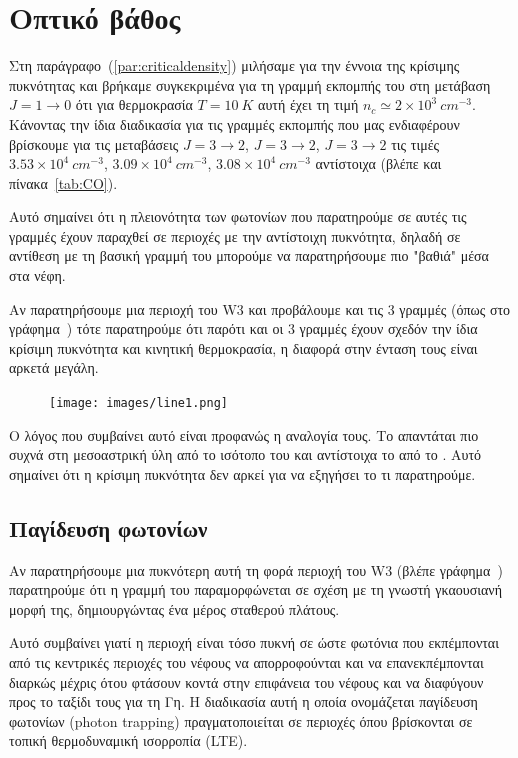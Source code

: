 \documentclass[a4paper,12pt]{memoir}
\newcommand{\e}[1]{\times 10^{#1}}
\begin{document}
\section{Οπτικό βάθος}
\label{par:od}
Στη παράγραφο~(\ref{par:criticaldensity}) μιλήσαμε για την έννοια της κρίσιμης πυκνότητας και βρήκαμε συγκεκριμένα για τη γραμμή εκπομπής του  στη μετάβαση $J=1\to 0$ ότι για θερμοκρασία $T=10\ K$ αυτή έχει τη τιμή $n_c \simeq 2\e{3} \ cm^{-3}$. 
Κάνοντας την ίδια διαδικασία για τις γραμμές εκπομπής που μας ενδιαφέρουν βρίσκουμε για τις μεταβάσεις  $J=3\to 2$,  $J=3\to 2$,  $J=3\to 2$ τις τιμές $3.53\e{4}\ cm^{-3}$, $3.09\e{4}\ cm^{-3}$, $3.08\e{4}\ cm^{-3}$ αντίστοιχα (βλέπε και πίνακα~\ref{tab:CO}).

Αυτό σημαίνει ότι η πλειονότητα των φωτονίων που παρατηρούμε σε αυτές τις γραμμές έχουν παραχθεί σε περιοχές με την αντίστοιχη πυκνότητα, δηλαδή σε αντίθεση με τη βασική γραμμή του  μπορούμε να παρατηρήσουμε πιο "βαθιά" μέσα στα νέφη.

Αν παρατηρήσουμε μια περιοχή του W3 και προβάλουμε και τις 3 γραμμές (όπως στο γράφημα~) τότε παρατηρούμε ότι παρότι και οι 3 γραμμές έχουν σχεδόν την ίδια κρίσιμη πυκνότητα και κινητική θερμοκρασία, η διαφορά στην ένταση τους είναι αρκετά μεγάλη. 

\begin{figure}[h]
	\centering
	\texttt{[image: images/line1.png]}
	\caption{}
\end{figure}

Ο λόγος που συμβαίνει αυτό είναι προφανώς η αναλογία τους. Το  απαντάται πιο συχνά στη μεσοαστρική ύλη από το ισότοπο του  και αντίστοιχα το  από το . Αυτό σημαίνει ότι η κρίσιμη πυκνότητα δεν αρκεί για να εξηγήσει το τι παρατηρούμε.

\subsection{Παγίδευση φωτονίων}
Αν παρατηρήσουμε μια πυκνότερη αυτή τη φορά περιοχή του W3 (βλέπε γράφημα~) παρατηρούμε ότι η γραμμή του  παραμορφώνεται σε σχέση με τη γνωστή γκαουσιανή μορφή της, δημιουργώντας ένα μέρος σταθερού πλάτους. 

Αυτό συμβαίνει γιατί η περιοχή είναι τόσο πυκνή σε  ώστε φωτόνια που εκπέμπονται από τις κεντρικές περιοχές του νέφους να απορροφούνται και να επανεκπέμπονται διαρκώς μέχρις ότου φτάσουν κοντά στην επιφάνεια του νέφους και να διαφύγουν προς το ταξίδι τους για τη Γη. Η διαδικασία αυτή η οποία ονομάζεται παγίδευση φωτονίων (photon trapping) πραγματοποιείται σε περιοχές όπου βρίσκονται σε τοπική θερμοδυναμική ισορροπία (LTE).
\end{document}
